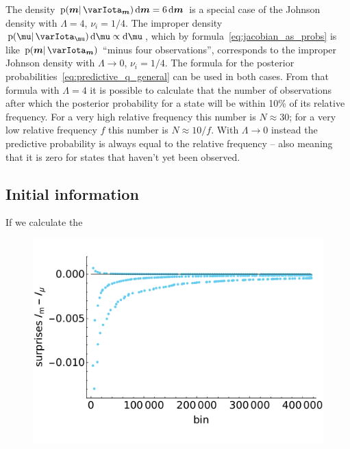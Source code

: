 \documentclass[\ifafour a4paper,12pt,\else a5paper,10pt,\fi%
onecolumn,oneside,article,%
british%
]{memoir}
\theoremstyle{remark}
\theoremstyle{innote}
\newcommand*{\di}{\mathrm{d}}%
\newcommand*{\pf}{\mathrm{p}}%
\renewcommand*{\|}{\mathpunct{|}}
\newcommand*{\yI}{\varIota}
\newcommand*{\yth}{\bm{\mu}}
\newcommand*{\yt}{\bm{m}}
\newcommand*{\yIth}{\yI_{\yth}}
\newcommand*{\yIt}{\yI_{\yt}}
\newcommand*{\yN}{\varLambda}
\newcommand*{\ynn}{\nu}
\begin{document}
\bigskip

The density $\pf(\yt \| \yIt)\,\di\yt = 6\,\di\yt$ is a special case of the
Johnson density with $\yN=4$, $\ynn_i=1/4$. The improper density
$\pf(\yth \| \yIth)\,\di\yth \propto \di\yth$, which by
formula~\eqref{eq:jacobian_as_probs} is like $\pf(\yt \| \yIt)$
\enquote{minus four observations}, corresponds to the improper Johnson
density with $\yN\to 0$, $\ynn_i=1/4$. The formula for the posterior
probabilities~\eqref{eq:predictive_q_general} can be used in both cases.
From that formula with $\yN=4$ it is possible to calculate that the number
of observations after which the posterior probability for a state will be
within 10\% of its relative frequency. For a very high relative frequency
this number is $N\approx 30$; for a very low relative frequency $f$ this
number is $N\approx 10/f$. With $\yN \to 0$ instead the predictive
probability is always equal to the relative frequency -- also meaning that
it is zero for states that haven't yet been observed.


\subsection{Initial information}
\label{sec:initial_info}

If we calculate the



\begin{figure}%
  \centering\includegraphics[width=\linewidth]{diff_surprises.pdf}\\
  \caption{}
  \label{fig:comp_priors}
\end{figure}%
\end{document}
